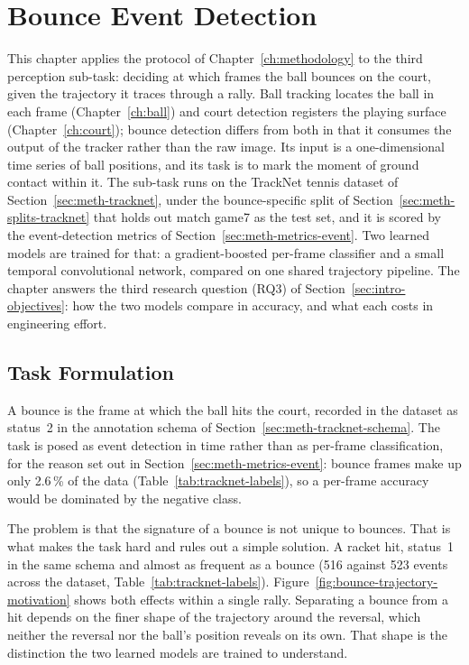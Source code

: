 \chapter{Bounce Event Detection}
\label{ch:bounce}

This chapter applies the protocol of Chapter~\ref{ch:methodology} to the third
perception sub-task: deciding at which frames the ball bounces on the court, given
the trajectory it traces through a rally. Ball tracking locates the ball in each
frame (Chapter~\ref{ch:ball}) and court detection registers the playing surface
(Chapter~\ref{ch:court}); bounce detection differs from both in that it consumes
the output of the tracker rather than the raw image. Its input is a
one-dimensional time series of ball positions, and its task is to mark the moment
of ground contact within it. The sub-task runs on the TrackNet tennis dataset of
Section~\ref{sec:meth-tracknet}, under the bounce-specific split of
Section~\ref{sec:meth-splits-tracknet} that holds out match game7 as the test set,
and it is scored by the event-detection metrics of
Section~\ref{sec:meth-metrics-event}. Two learned models are trained for that: a
gradient-boosted per-frame classifier and a small temporal convolutional network,
compared on one shared trajectory pipeline. The chapter answers the third
research question (RQ3) of Section~\ref{sec:intro-objectives}: how the two models
compare in accuracy, and what each costs in engineering effort.

\section{Task Formulation}
\label{sec:bounce-task}

A bounce is the frame at which the ball hits the court, recorded in the dataset
as status~2 in the annotation schema of Section~\ref{sec:meth-tracknet-schema}.
The task is posed as event detection in time rather than as per-frame
classification, for the reason set out in Section~\ref{sec:meth-metrics-event}:
bounce frames make up only 2.6\,\% of the data
(Table~\ref{tab:tracknet-labels}), so a per-frame accuracy would be dominated by
the negative class.

The problem is that the signature of a bounce is not unique to bounces. That is what
makes the task hard and rules out a simple solution. A racket hit, status~1 in the
same schema and almost as frequent as a bounce (516 against 523 events across the
dataset, Table~\ref{tab:tracknet-labels}).
Figure~\ref{fig:bounce-trajectory-motivation} shows both effects within a single
rally. Separating a bounce from a hit depends on the finer shape of the
trajectory around the reversal, which neither the reversal nor the ball's position
reveals on its own. That shape is the distinction the two learned models are
trained to understand.


